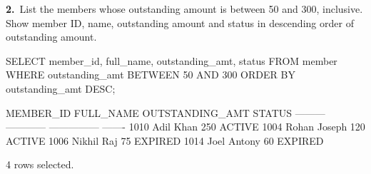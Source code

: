 \noindent\begin{minipage}{\linewidth}
\begingroup{}
{\fontsize{14}{17}\selectfont\textbf{2.}}\ List the members whose outstanding amount is between 50 and 300, inclusive. Show member ID, name, outstanding amount and status in descending order of outstanding amount.\par
\endgroup\vspace{12pt}


\begin{sqlcode}
SELECT member_id, full_name, outstanding_amt, status
FROM member
WHERE outstanding_amt BETWEEN 50 AND 300
ORDER BY outstanding_amt DESC;
\end{sqlcode}

\vspace{18pt}


\begin{sqlout}[fontsize=\small]
MEMBER_ID  FULL_NAME     OUTSTANDING_AMT  STATUS 
---------  ------------  ---------------  -------
     1010  Adil Khan                 250  ACTIVE
     1004  Rohan Joseph              120  ACTIVE
     1006  Nikhil Raj                 75  EXPIRED
     1014  Joel Antony                60  EXPIRED

4 rows selected.
\end{sqlout}
\end{minipage}\par\vspace{24pt}

